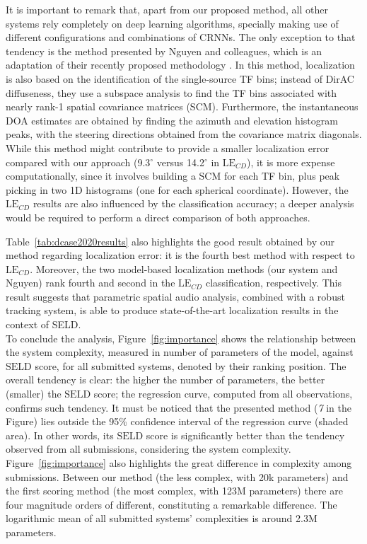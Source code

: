 It is important to remark that, apart from our proposed method, all other systems rely completely on deep learning algorithms, specially making use of different configurations and combinations of CRNNs. 
The only exception to that tendency is the method presented by Nguyen and colleagues, which is an adaptation of their recently proposed methodology \cite{Nguyen2020_task3_report, nguyen2020sequence}. In this method, localization is also based on the identification of the single-source TF bins; instead of DirAC diffuseness, they use a subspace analysis to find the TF bins associated with nearly rank-1 spatial covariance matrices (SCM). 
Furthermore, the instantaneous DOA estimates are obtained by finding the azimuth and elevation histogram peaks, with the steering directions obtained from the covariance matrix diagonals. 
While this method might contribute to provide a smaller localization error compared with our approach (9.3$^{\circ}$ versus 14.2$^{\circ}$ in $\text{LE}_{CD}$), it is more expense computationally, since it involves building a SCM for each TF bin, plus peak picking in two 1D histograms (one for each spherical coordinate). 
However, the $\text{LE}_{CD}$ results are also influenced by the classification accuracy; a deeper analysis would be required to perform a direct comparison of both approaches.

Table~\ref{tab:dcase2020results} also highlights the good result obtained by our method regarding localization error: it is the fourth best method with respect to $\text{LE}_{CD}$. 
Moreover, the two model-based localization methods (our system and Nguyen) rank fourth and second in the $\text{LE}_{CD}$ classification, respectively. 
This result suggests that parametric spatial audio analysis, combined with a robust tracking system, is able to produce state-of-the-art localization results in the context of SELD. \\

To conclude the analysis, Figure~\ref{fig:importance} shows the relationship between the system complexity, measured in number of parameters of the model, against $\text{SELD}$ score, for all submitted systems, denoted by their ranking position. 
The overall tendency is clear: the higher the number of parameters, the better (smaller) the $\text{SELD}$ score; the regression curve, computed from all observations, confirms such tendency. 
It must be noticed that the presented method (\textit{7} in the Figure) lies outside the 95\% confidence interval of the regression curve (shaded area). In other words, its $\text{SELD}$ score is significantly better than the tendency observed from all submissions, considering the system complexity. 
Figure~\ref{fig:importance} also highlights the great difference in complexity among submissions. Between our method (the less complex, with 20k parameters) and the first scoring method (the most complex, with 123M parameters) there are four magnitude orders of different, constituting a remarkable difference. The logarithmic mean of all submitted systems' complexities is around 2.3M parameters. 

